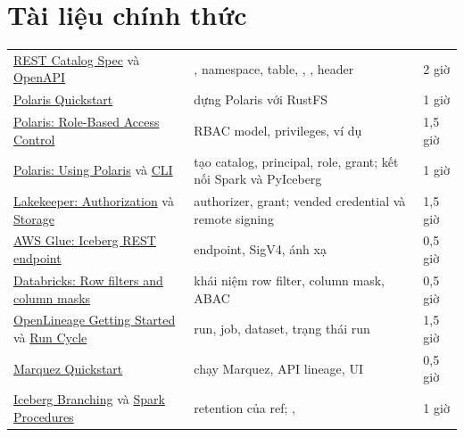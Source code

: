 \section{Tài liệu chính thức}
\begin{xltabular}{\textwidth}{@{}P{4.2cm} L P{1.8cm}@{}}
\toprule
{} &  &  \\
\midrule
\endhead
\bottomrule
\endfoot
\href{https://iceberg.apache.org/rest-catalog-spec/}{REST Catalog Spec} và \href{https://github.com/apache/iceberg/blob/main/open-api/rest-catalog-open-api.yaml}{OpenAPI} & , namespace, table, , , header  & 2 giờ \\
\href{https://polaris.apache.org/guides/quickstart/}{Polaris Quickstart} & dựng Polaris với RustFS & 1 giờ \\
\href{https://polaris.apache.org/in-dev/unreleased/managing-security/access-control/}{Polaris: Role-Based Access Control} & RBAC model, privileges, ví dụ & 1,5 giờ \\
\href{https://polaris.apache.org/releases/1.1.0/getting-started/using-polaris/}{Polaris: Using Polaris} và \href{https://polaris.apache.org/releases/1.4.1/command-line-interface/}{CLI} & tạo catalog, principal, role, grant; kết nối Spark và PyIceberg & 1 giờ \\
\href{https://docs.lakekeeper.io/docs/nightly/authorization/}{Lakekeeper: Authorization} và \href{https://docs.lakekeeper.io/docs/nightly/storage/}{Storage} & authorizer, grant; vended credential và remote signing & 1,5 giờ \\
\href{https://docs.aws.amazon.com/glue/latest/dg/connect-glu-iceberg-rest.html}{AWS Glue: Iceberg REST endpoint} & endpoint, SigV4, ánh xạ  & 0,5 giờ \\
\href{https://docs.databricks.com/aws/en/data-governance/unity-catalog/filters-and-masks/}{Databricks: Row filters and column masks} & khái niệm row filter, column mask, ABAC & 0,5 giờ \\
\href{https://openlineage.io/getting-started/}{OpenLineage Getting Started} và \href{https://openlineage.io/docs/spec/run-cycle/}{Run Cycle} & run, job, dataset, trạng thái run & 1,5 giờ \\
\href{https://marquezproject.ai/docs/quickstart/}{Marquez Quickstart} & chạy Marquez, API lineage, UI & 0,5 giờ \\
\href{https://iceberg.apache.org/docs/latest/branching/}{Iceberg Branching} và \href{https://iceberg.apache.org/docs/latest/spark-procedures/}{Spark Procedures} & retention của ref; ,  & 1 giờ \\
\end{xltabular}

